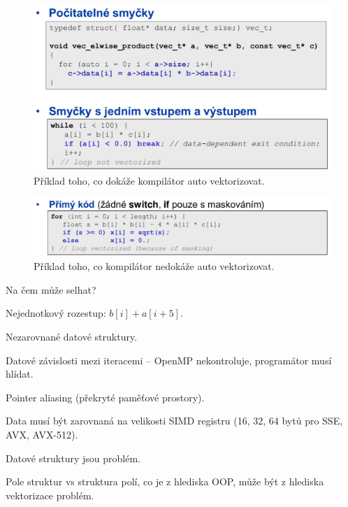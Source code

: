 \begin{compactitem}
\begin{compactitem}
        \begin{figure}[H]
            \centering
            \includegraphics[width=0.85\linewidth]{auto_vektorizace_1.pdf}
            \caption{Příklad toho, co dokáže kompilátor auto vektorizovat.}
        \end{figure}

        \begin{figure}[H]
            \centering
            \includegraphics[width=0.85\linewidth]{auto_vektorizace_2.pdf}
            \caption{Příklad toho, co kompilátor nedokáže auto vektorizovat.}
        \end{figure}
    \end{compactitem}

    \item Na čem může selhat? \begin{compactitem}
        \item Nejednotkový rozestup: $b[i] + a[i+5]$.
        \item Nezarovnané datové struktury.
        \item Datové závislosti mezi iteracemi -- OpenMP nekontroluje, programátor musí hlídat.
        \item Pointer aliasing (překryté paměťové prostory).
        \item Data musí být zarovnaná na velikosti SIMD registru (16, 32, 64 bytů pro SSE, AVX, AVX-512).
    \end{compactitem}

    \item Datové struktury jsou problém. \begin{compactitem}
        \item Pole struktur vs struktura polí, co je  z hlediska OOP, může být z hlediska vektorizace problém.
    \end{compactitem}


\end{compactitem}
